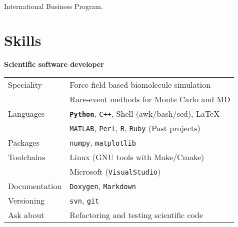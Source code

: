 \documentclass[margin]{res}
\begin{document}
\begin{sloppypar}
\begin{resume}



\\
International Business Program.


\section{Skills}
\textbf{Scientific software developer} \\
\begin{tabular}{l p{3in}}
    Speciality & Force-field based biomolecule simulation \\
                & Rare-event methods for Monte Carlo and MD \\
    Languages & \textbf{\texttt{Python}}, \texttt{C++}, Shell (awk/bash/sed), \LaTeX \\
              & \textsc{\texttt{MATLAB}}, \texttt{Perl}, \texttt{R}, \texttt{Ruby} (Past projects) \\
    Packages & \texttt{numpy}, \texttt{matplotlib} \\
    Toolchains & Linux (GNU tools with Make/Cmake) \\
                 & Microsoft (\texttt{VisualStudio}) \\
    Documentation & \texttt{Doxygen}, \texttt{Markdown} \\
    Versioning & \texttt{svn}, \texttt{git} \\
    Ask about & Refactoring and testing scientific code \\
\end{tabular}


\end{resume}
\end{sloppypar}
\end{document}
